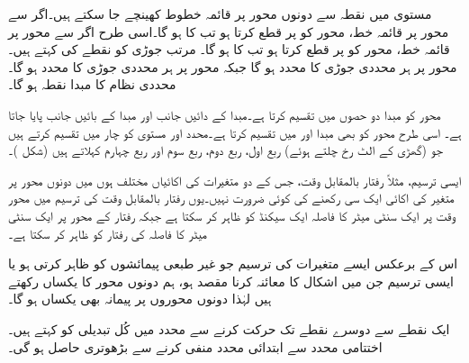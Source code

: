 مستوی میں نقطہ  سے دونوں محور پر قائمہ خطوط کھینچے جا سکتے ہیں۔اگر  سے محور  پر قائمہ خط، محور  کو  پر قطع کرتا ہو تب  کا   ہو گا۔اسی طرح اگر  سے محور  پر قائمہ خط،  محور  کو  پر قطع کرتا ہو تب  کا   ہو گا۔  مرتب جوڑی  کو نقطے کی  کہتے ہیں۔محور  پر ہر محددی جوڑی کا  محدد  ہو گا جبکہ محور  پر ہر محددی جوڑی کا  محدد  ہو گا۔محددی نظام کا مبدا نقطہ  ہو گا۔ 

محور   کو مبدا دو حصوں میں تقسیم کرتا ہے۔مبدا کے دائیں جانب  اور مبدا کے بائیں جانب  پایا جاتا ہے۔ اسی طرح محور  کو   بھی  مبدا  اور  میں تقسیم کرتا ہے۔محدد   اور  مستوی کو چار  میں تقسیم کرتے ہیں جو (گھڑی کے الٹ رخ چلتے ہوئے) ربع اول، ربع دوم، ربع سوم اور ربع چہارم کہلاتے ہیں (شکل )۔

ایسی  ترسیم، مثلاً رفتار بالمقابل وقت، جس کے دو متغیرات کی اکائیاں مختلف ہوں میں دونوں محور پر متغیر کی  اکائی   ایک  سی رکھنے کی کوئی ضرورت نہیں۔یوں رفتار بالمقابل وقت کی ترسیم میں محور وقت پر ایک سنٹی میٹر کا فاصلہ ایک سیکنڈ کو ظاہر کر سکتا ہے جبکہ رفتار کے محور پر ایک سنٹی میٹر کا فاصلہ  کی رفتار کو ظاہر کر سکتا ہے۔

اس کے برعکس ایسے متغیرات کی ترسیم جو غیر طبعی پیمائشوں کو ظاہر کرتی ہو یا ایسی ترسیم جن میں اشکال کا معائنہ کرنا مقصد ہو، ہم دونوں محور کا     یکساں رکھتے ہیں لہٰذا دونوں محوروں پر پیمانہ بھی  یکساں ہو گا۔

ایک نقطے  سے دوسرے نقطے تک حرکت کرنے سے محدد میں کُل تبدیلی کو  کہتے ہیں۔ اختتامی محدد سے ابتدائی محدد منفی کرنے سے بڑھوتری حاصل ہو گی۔


